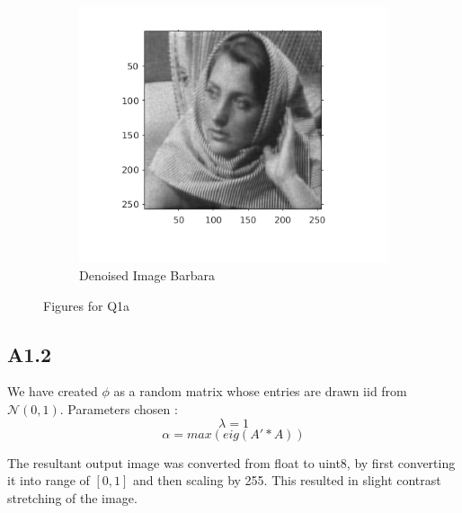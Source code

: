 \documentclass{article}
\begin{document}
\begin{figure}[H]
\begin{subfigure}[t]{0.32\textwidth}
    \includegraphics[scale=0.5]{images/denoised_image_barbara}
    \caption{Denoised Image Barbara}
    \label{Fig: 1c}
  \end{subfigure}

  \caption{Figures for Q1a}
\end{figure}
\pagebreak

\subsection*{A1.2}
We have created $\phi$ as a random matrix whose entries are drawn iid from $\mathcal{N}(0,1)$.
Parameters chosen :
$$\lambda = 1$$
$$\alpha = max(eig(A'*A))$$

The resultant output image was converted from float to uint8, by first converting it into range of $[0,1]$ and then
scaling by 255. This resulted in slight contrast stretching of the image.
\end{document}
